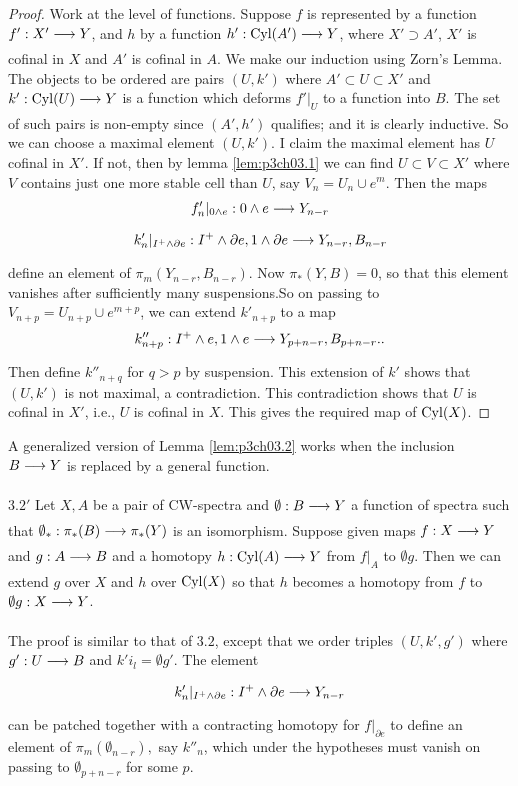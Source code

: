 \documentclass[../main]{subfiles}
\begin{document}
\begin{proof}
Work at the level of functions. Suppose $f$ is represented by a function $f':X'\lar{}Y$, and $h$ by a function $h':\te{Cyl}(A')\lar{}Y$, where $X'\supset A'$, $X'$ is cofinal in $X$ and $A'$ is cofinal in $A$. We make our induction using Zorn's Lemma. The objects to be ordered are pairs $(U,k')$ where $A'\subset U\subset X'$ and $k':\te{Cyl}(U)\lar{} Y$ is a function which deforms $f'|_U$ to a function into $B$. 
The set of such pairs is non-empty since $(A',h')$ qualifies; and it is clearly inductive. So we can choose a
maximal element $(U,k')$. I claim the maximal element has $U$ cofinal
in $X'$. If not, then by lemma \ref{lem:p3ch03.1} we can find $U\subset V\subset X'$ where $V$ contains just one more stable cell than $U$, say $V_n=U_n\cup e^m$. Then the maps \[f'_n|_{0\wedge e}: 0\wedge e\lar{} Y_{n-r} \]
\[k_n'|_{I^+ \wedge \partial e}: I^+ \wedge \partial e, 1\wedge \partial e\lar{} Y_{n-r},B_{n-r} \]
define an element of $\pi_m(Y_{n-r},B_{n-r})$. Now $\pi_\ast(Y,B)=0$, so that this element vanishes after sufficiently many suspensions.So on passing to $V_{n+p}= U_{n+p}\cup e^{m+p}$, we can extend $k'_{n+p}$ to a map \[k''_{n+p}: I^+\wedge e, 1\wedge e \lar{} Y_{p+n-r},B_{p+n-r}.. \]
Then define $k''_{n+q}$ for $q>p$ by suspension. This extension of $k'$ shows that $(U,k')$ is not maximal, a contradiction. This contradiction shows that $U$ is cofinal in $X'$, i.e., $U$ is cofinal in $X$. This gives the required map of $\mathrm{Cyl}(X)$.
\end{proof}
A generalized version of Lemma \ref{lem:p3ch03.2} works when the inclusion $B\lar{}Y$ is replaced by a general function. 

\begin{customlemma}{$3.2'$} \label{lem:p3ch03.2'}
Let $X,A$ be a pair of CW-spectra and $\emptyset: B\lar{}  Y$ a function of spectra such that $\emptyset_\ast:\pi_\ast (B)\lar{}\pi_\ast(Y)$ is an isomorphism. Suppose given maps $f:X\lar{}Y$ and $g:A\lar{}B$ and a homotopy $h:\te{Cyl}(A)\lar{}Y$ from $f|_A$ to $\emptyset g$. Then we can extend $g$ over $X$ and $h$ over $\mathrm{Cyl}(X)$ so that $h$ becomes a homotopy from $f$ to $\emptyset g:X\lar{}Y$.
\end{customlemma}
The proof is similar to that of $3.2$, except that we order triples $(U,k',g')$ where $g':U\lar{}B$ and $k' i_l = \emptyset g'$. The element \[k'_n|_{I^+\wedge \partial e}: I^+\wedge \partial e\lar{} Y_{n-r}\]
can be patched together with a contracting homotopy for $f|_{\partial e}$ to define an element of $\pi_m(\emptyset_{n-r}),$ say $k''_n$, which under the hypotheses must vanish on passing to $\emptyset_{p+n-r}$ for some $p$.
\end{document}
